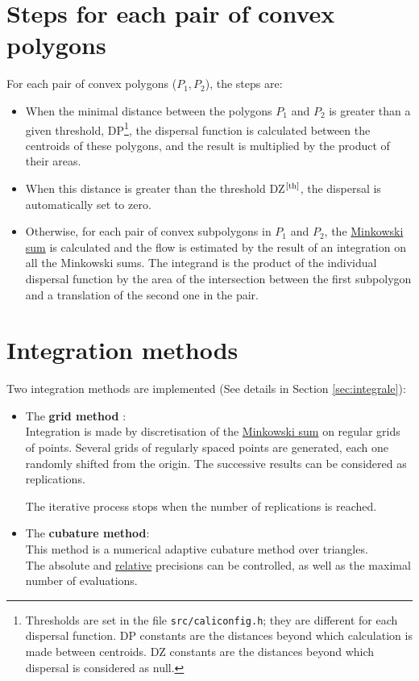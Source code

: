 \section{Steps for each pair of convex polygons}
\label{sec:steps}
For each pair of convex polygons ($P_1, P_2$), the steps are:
\begin{itemize}

\item
When  the minimal distance between the polygons $P_1$ and $P_2$ is
greater
than a given threshold, DP\footnote{\label{th}Thresholds are set in the file
\texttt{src/caliconfig.h}; they are different for each dispersal 
function. DP constants are the distances beyond which calculation
is made between centroids. DZ constants are the distances beyond which
dispersal is considered as null.},
the dispersal function is calculated between the centroids of these
polygons, and the result is multiplied by the product of their  areas.
\item
When this distance is
greater than the threshold DZ$^\text{\ref{th}}$,
the dispersal is automatically
set to zero.

\item
Otherwise, 
for each pair of convex 
subpolygons in $P_1$ and $P_2$, the \hyperlink{mink}{Minkowski sum}
  is calculated and the flow  is estimated by 
the result of an integration
on all the Minkowski sums. The integrand
is the product of the individual dispersal function
by the area of the intersection between the first subpolygon and
a translation of the second one in the pair.

\end{itemize}


\section{Integration methods}
\label{integration:methods}
Two integration
methods are implemented (See details in Section \ref{sec:integrale}):

\begin{itemize}
\item
The \textbf{grid method} :\\
Integration is made by discretisation of
 the \hyperlink{mink}{Minkowski sum} on  regular grids of
 points.
Several grids of regularly spaced points are generated,
each one randomly shifted  from the origin.
The successive results can be considered as replications.

The iterative process stops when the
number of replications is reached.


\item 
The \textbf{cubature method}:\\
This  method is a numerical adaptive cubature method over
triangles.\\
The absolute and \hyperlink{reler}{relative} precisions can be
controlled, as well as the maximal number of evaluations.


 
\end{itemize}

